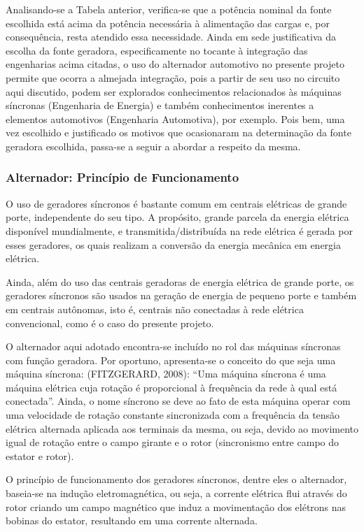 Analisando-se a Tabela anterior, verifica-se que a potência nominal da fonte escolhida está acima da potência necessária à alimentação das cargas e, por consequência, resta atendido essa necessidade. 
Ainda em sede justificativa da escolha da fonte geradora, especificamente no tocante à integração das engenharias acima citadas, o uso do alternador automotivo no presente projeto permite que ocorra a almejada integração, pois a partir de seu uso no circuito aqui discutido, podem ser explorados conhecimentos relacionados às máquinas síncronas (Engenharia de Energia) e também conhecimentos inerentes a elementos automotivos (Engenharia Automotiva), por exemplo.
Pois bem, uma vez escolhido e justificado os motivos que ocasionaram na determinação da fonte geradora escolhida, passa-se a seguir a abordar a respeito da mesma.

\subsubsection{Alternador: Princípio de Funcionamento}
\label{alternador-funcionamento}


O uso de geradores síncronos é bastante comum em centrais elétricas de grande porte, independente do seu tipo. A propósito, grande parcela da energia elétrica disponível mundialmente, e transmitida/distribuída na rede elétrica é gerada por esses geradores, os quais realizam a conversão da energia mecânica em energia elétrica. 

Ainda, além do uso das centrais geradoras de energia elétrica de grande porte, os geradores síncronos são usados na geração de energia de pequeno porte e também em centrais autônomas, isto é, centrais não conectadas à rede elétrica convencional, como é o caso do presente projeto.

O alternador aqui adotado encontra-se incluído no rol das máquinas síncronas com função geradora. Por oportuno, apresenta-se o conceito do que seja uma máquina síncrona: (FITZGERARD, 2008): “Uma máquina síncrona é uma máquina elétrica cuja rotação é proporcional à frequência da rede à qual está conectada”. Ainda, o nome síncrono se deve ao fato de esta máquina operar com uma velocidade de rotação constante sincronizada com a frequência da tensão elétrica alternada aplicada aos terminais da mesma, ou seja, devido ao movimento igual de rotação entre o campo girante e o rotor (sincronismo entre campo do estator e rotor).

O princípio de funcionamento dos geradores síncronos, dentre eles o alternador, baseia-se na indução eletromagnética, ou seja, a corrente elétrica flui através do rotor criando um campo magnético que induz a movimentação dos elétrons nas bobinas do estator, resultando em uma corrente alternada.

